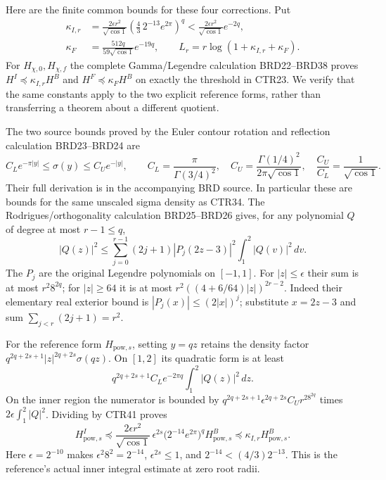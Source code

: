 Here are the finite common bounds for these four corrections. Put
\[
 \begin{split}
 \kappa_{I,r}
  &=\frac{2\epsilon r^2}{\sqrt{\cos1}}
       \left(\frac43\,2^{-13}e^{2\pi}\right)^q
    <\frac{2\epsilon r^2}{\sqrt{\cos1}}e^{-2q},\\
 \kappa_F&=\frac{512q}{59\sqrt{\cos1}}e^{-19q},\qquad
 L_r=r\log(1+\kappa_{I,r}+\kappa_F).
 \end{split}
 \tag{CTR38}
\]
For $H_{\chi,0},H_{\chi,f}$ the complete Gamma/Legendre calculation
BRD22--BRD38 proves
$H^I\preceq\kappa_{I,r}H^B$ and
$H^F\preceq\kappa_FH^B$ on exactly the threshold in CTR23.
We verify that the same constants apply to the two explicit reference
forms, rather than transferring a theorem about a different quotient.

The two source bounds proved by the Euler contour rotation and
reflection calculation BRD23--BRD24 are
\[
 C_Le^{-\pi|y|}\leq\sigma(y)\leq C_Ue^{-|y|},\qquad
 C_L=\frac{\pi}{\Gamma(3/4)^2},\quad
 C_U=\frac{\Gamma(1/4)^2}{2\pi\sqrt{\cos1}},\quad
 \frac{C_U}{C_L}=\frac1{\sqrt{\cos1}}.
 \tag{CTR39}
\]
Their full derivation is in the accompanying BRD source. In particular
these are bounds for the same unscaled sigma density as CTR34.
The Rodrigues/orthogonality calculation BRD25--BRD26 gives, for any
polynomial $Q$ of degree at most $r-1\leq q$,
\[
 |Q(z)|^2\leq
 \sum_{j=0}^{r-1}(2j+1)|P_j(2z-3)|^2\int_1^2|Q(v)|^2\,dv.
 \tag{CTR40}
\]
The $P_j$ are the original Legendre polynomials on $[-1,1]$.
For $|z|\leq\epsilon$ their sum is at most $r^2 8^{2q}$;
for $|z|\geq64$ it is at most
$r^2((4+6/64)|z|)^{2r-2}$.
Indeed their elementary real exterior bound is
$|P_j(x)|\leq(2|x|)^j$; substitute $x=2z-3$ and sum
$\sum_{j<r}(2j+1)=r^2$.

For the reference form $H_{\mathrm{pow},s}$, setting $y=qz$ retains
the density factor $q^{2q+2s+1}|z|^{2q+2s}\sigma(qz)$.
On $[1,2]$ its quadratic form is at least
\[
 q^{2q+2s+1}C_Le^{-2\pi q}\int_1^2|Q(z)|^2\,dz.
 \tag{CTR41}
\]
On the inner region the numerator is bounded by
$q^{2q+2s+1}\epsilon^{2q+2s}C_Ur^28^{2q}$
times $2\epsilon\int_1^2|Q|^2$. Dividing by CTR41 proves
\[
 H_{\mathrm{pow},s}^I\preceq
 \frac{2\epsilon r^2}{\sqrt{\cos1}}\,
       \epsilon^{2s}\bigl(2^{-14}e^{2\pi}\bigr)^q
       H_{\mathrm{pow},s}^B
 \preceq\kappa_{I,r}H_{\mathrm{pow},s}^B.
 \tag{CTR42}
\]
Here $\epsilon=2^{-10}$ makes $\epsilon^2 8^2=2^{-14}$,
$\epsilon^{2s}\leq1$, and
$2^{-14}<(4/3)2^{-13}$. This is the reference's actual
inner integral estimate at zero root radii.

